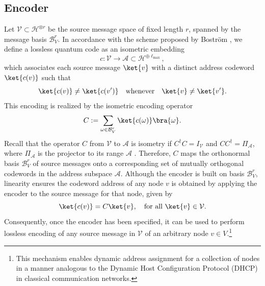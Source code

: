 \documentclass[conference]{IEEEtran}
\begin{document}
\subsection{Encoder}
Let $\mathcal{V}\subset \mathcal{H}^{\otimes r}$ be the source message space of fixed length $r$, spanned by the message basis $\mathcal{B}_V^r$. 
In accordance with the scheme proposed by Boström \cite{PhysRevA.65.032313}, we define a lossless quantum code as an isometric embedding
\begin{equation}
    c: \mathcal{V} \longrightarrow \mathcal{A} \subset \mathcal{H}^{\oplus \ell_\mathrm{max}}, \label{general_code}
\end{equation}
which associates each source message $\ket{v}$ with a distinct address codeword $\ket{c(v)}$ such that
\begin{equation}
    \ket{c(v)}\neq\ket{c(v')} \quad \text{whenever} \quad \ket{v}\neq \ket{v'}. \label{injectivity}
\end{equation}
This encoding is realized by the isometric encoding operator
\begin{equation}
    C:= \sum_{\omega\in \mathcal{B}_V^r}\ket{c(\omega)}\bra{\omega}. \label{general_encoder}
\end{equation}
Recall that the operator $C$ from $\mathcal{V}$ to $\mathcal{A}$ is isometry if $C^{\dagger}C=I_{\mathcal{V}}$ and $CC^{\dagger}=\Pi_\mathcal{A}$, where $\Pi_\mathcal{A}$ is the projector to its range $\mathcal{A}$ \cite{Wilde_2017}.
Therefore, $C$ maps the orthonormal basis $\mathcal{B}_V^r$ of source messages onto a corresponding set of mutually orthogonal codewords in the address subspace $\mathcal{A}$.
Although the encoder is built on basis $\mathcal{B}_V^r$, linearity ensures the codeword address of any node $v$ is obtained by applying the encoder to the source message for that node, given by
\begin{equation}
    \ket{c(v)} = C\ket{v}, \quad \text{for all } \ket{v} \in \mathcal{V}.
\end{equation}
Consequently, once the encoder has been specified, it can be used to perform lossless encoding of any source message in $\mathcal{V}$ of an arbitrary node $v \in V$.\footnote{This mechanism enables dynamic address assignment for a collection of nodes in a manner analogous to the Dynamic Host Configuration Protocol (DHCP) in classical communication networks.}
\end{document}
